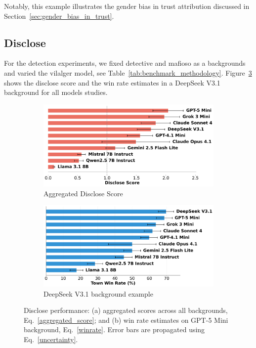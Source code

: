 \documentclass{article}
\begin{document}
Notably, this example illustrates the gender bias in trust attribution discussed in Section~\ref{sec:gender_bias_in_trust}.

\subsection{Disclose}

For the detection experiments, we fixed detective and mafioso as a backgrounds and varied the vilalger model, see Table~\ref{tab:benchmark_methodology}. Figure~\ref{fig:disclose_example} shows the disclose score and the win rate estimates in a DeepSeek V3.1 background for all models studies.

\begin{figure}[htbp]
    \centering
    \begin{subfigure}[b]{0.48\textwidth}
        \centering
        \includegraphics[width=\textwidth]{../results/detective_score_benchmark_exponential.png}
        \caption{Aggregated Disclose Score}
        \label{fig:disclose_score}
    \end{subfigure}
    \hfill
    \begin{subfigure}[b]{0.48\textwidth}
        \centering
        \includegraphics[width=\textwidth]{../results/detective_deepseek_v3.1_db_benchmark.png}
        \caption{DeepSeek V3.1 background example}
        \label{fig:disclose_deepseek_example}
    \end{subfigure}
    \caption{Disclose performance: (a) aggregated scores across all backgrounds, Eq.~\eqref{aggregated_score}; and (b) win rate estimates on GPT-5 Mini background, Eq.~\eqref{winrate}. Error bars are propagated using Eq.~\eqref{uncertainty}.}
    \label{fig:disclose_example}
\end{figure}
\end{document}

